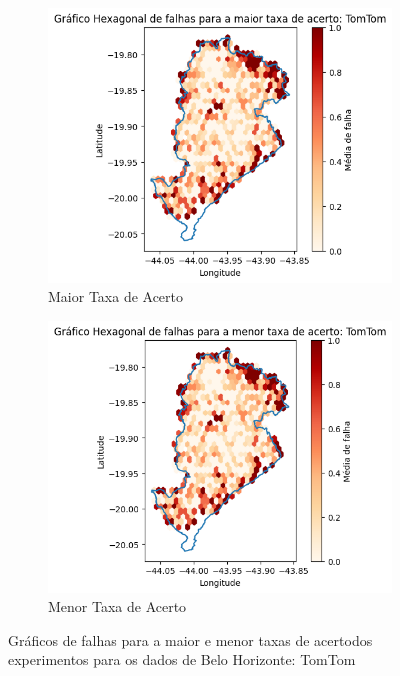 \begin{figure}[ht]
  \centering
  \begin{subfigure}[b]{0.45\textwidth}
    \includegraphics[width=\textwidth]{Figuras/expFalhasTomtommaior.png}
    \caption{Maior Taxa de Acerto}
    \label{fig:falhastomtomBHexpMaior}
  \end{subfigure}
  \hfill
  \begin{subfigure}[b]{0.45\textwidth}
    \includegraphics[width=\textwidth]{Figuras/expFalhasTomtommenor.png}
    \caption{Menor Taxa de Acerto}
    \label{fig:falhastomtomBHexpMenor}
  \end{subfigure}
  
  \caption{Gráficos de falhas para a maior e menor taxas de acertodos experimentos para os dados de Belo Horizonte: TomTom}
  \label{fig:falhas-exp-tomtom-bh}
\end{figure}

